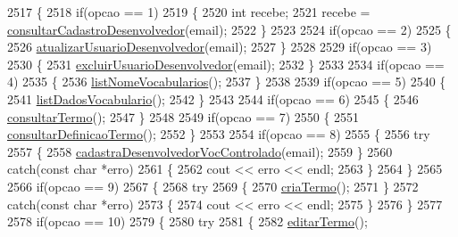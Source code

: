 \begin{DoxyCode}
2517 \{
2518   \textcolor{keywordflow}{if}(opcao == 1)
2519   \{
2520     \textcolor{keywordtype}{int} recebe;
2521       recebe = \mbox{\hyperlink{class_servico_usuarios_desenvolvedor_a552cca1c14e7c9dd87600062d524ffa8}{consultarCadastroDesenvolvedor}}(email);
2522   \}
2523 
2524   \textcolor{keywordflow}{if}(opcao == 2)
2525   \{
2526     \mbox{\hyperlink{class_servico_usuarios_desenvolvedor_a2dc1811265f101d3ce14150594b25e88}{atualizarUsuarioDesenvolvedor}}(email);
2527   \}
2528 
2529   \textcolor{keywordflow}{if}(opcao == 3)
2530   \{
2531     \mbox{\hyperlink{class_servico_usuarios_desenvolvedor_ad536645995beed517216ed96206ae018}{excluirUsuarioDesenvolvedor}}(email);
2532   \}
2533 
2534   \textcolor{keywordflow}{if}(opcao == 4)
2535   \{
2536     \mbox{\hyperlink{class_servico_usuarios_desenvolvedor_ad4f1b230cdb25ff8a2b8ae0010e99382}{listNomeVocabularios}}();
2537   \}
2538 
2539   \textcolor{keywordflow}{if}(opcao == 5)
2540   \{
2541     \mbox{\hyperlink{class_servico_usuarios_desenvolvedor_a5748ea9d0e56ffcad31ad486ecb8b79f}{listDadosVocabulario}}();
2542   \}
2543 
2544   \textcolor{keywordflow}{if}(opcao == 6)
2545   \{
2546     \mbox{\hyperlink{class_servico_usuarios_desenvolvedor_a9c4a519147798c77d3fb6406f8078b9f}{consultarTermo}}();
2547   \}
2548 
2549   \textcolor{keywordflow}{if}(opcao == 7)
2550   \{
2551     \mbox{\hyperlink{class_servico_usuarios_desenvolvedor_aa125405f5b747e4e7bbacebd28934e72}{consultarDefinicaoTermo}}();
2552   \}
2553 
2554   \textcolor{keywordflow}{if}(opcao == 8)
2555   \{
2556     \textcolor{keywordflow}{try}
2557     \{
2558       \mbox{\hyperlink{class_servico_usuarios_desenvolvedor_a1708877c02739b2447862b2e2349267d}{cadastraDesenvolvedorVocControlado}}(email);
2559     \}
2560     \textcolor{keywordflow}{catch}(\textcolor{keyword}{const} \textcolor{keywordtype}{char} *erro)
2561     \{
2562       cout << erro << endl;
2563     \}
2564   \}
2565 
2566   \textcolor{keywordflow}{if}(opcao == 9)
2567   \{
2568     \textcolor{keywordflow}{try}
2569     \{
2570       \mbox{\hyperlink{class_servico_usuarios_desenvolvedor_ab378812b1e6b4d648fb8860cf8444210}{criaTermo}}();
2571     \}
2572     \textcolor{keywordflow}{catch}(\textcolor{keyword}{const} \textcolor{keywordtype}{char} *erro)
2573     \{
2574       cout << erro << endl;
2575     \}
2576   \}
2577 
2578   \textcolor{keywordflow}{if}(opcao == 10)
2579   \{
2580     \textcolor{keywordflow}{try}
2581     \{
2582       \mbox{\hyperlink{class_servico_usuarios_desenvolvedor_afb392520e6ea1209abb42ad0327673e0}{editarTermo}}();

\end{DoxyCode}
